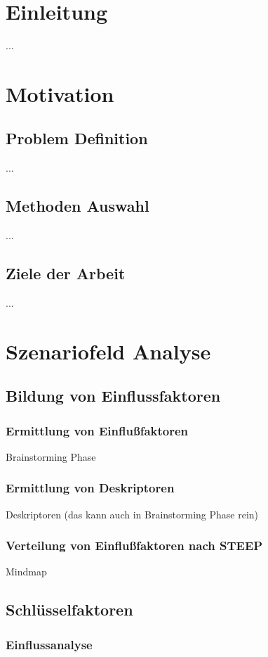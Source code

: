\chapter{Einleitung}
    ... \autocite{amine, elham, laura, lisa}

\chapter{Motivation}
    \section{Problem Definition}
    ...
    \section{Methoden Auswahl}
    ...
    \section{Ziele der Arbeit}
    ...

\chapter{Szenariofeld Analyse}
    \section{Bildung von Einflussfaktoren}
        \subsection{Ermittlung von Einflußfaktoren}
        Brainstorming Phase
        \subsection{Ermittlung von Deskriptoren}
        Deskriptoren (das kann auch in Brainstorming Phase rein)
        \subsection{Verteilung von Einflußfaktoren nach STEEP}
        Mindmap
    \section{Schlüsselfaktoren}
        \subsection{Einflussanalyse}
